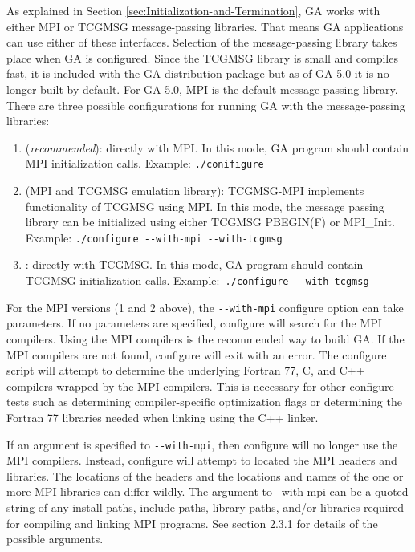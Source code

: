 As explained in Section \ref{sec:Initialization-and-Termination},
GA works with either MPI or TCGMSG message-passing libraries. That
means GA applications can use either of these interfaces. Selection
of the message-passing library takes place when GA is configured.
Since the TCGMSG library is small and compiles fast, it is included
with the GA distribution package but as of GA 5.0 it is no longer
built by default. For GA 5.0, MPI is the default message-passing library.
There are three possible configurations for running GA with the message-passing
libraries:
\begin{enumerate}
\item \textcolor{black}{} (\emph{recommended}): directly
with MPI. In this mode, GA program should contain MPI initialization
calls. Example: \texttt{./conifigure}
\item \textcolor{black}{} (MPI and TCGMSG emulation
library): TCGMSG-MPI implements functionality of TCGMSG using MPI.
In this mode, the message passing library can be initialized using
either TCGMSG PBEGIN(F) or MPI\_Init. Example: \texttt{./configure
-{}-with-mpi -{}-with-tcgmsg }
\item \textcolor{black}{}: directly with TCGMSG.
In this mode, GA program should contain TCGMSG initialization calls.
Example:\texttt{ ./configure -{}-with-tcgmsg }
\end{enumerate}
For the MPI versions (1 and 2 above), the \texttt{-{}-with-mpi} configure
option can take parameters. If no parameters are specified, configure
will search for the MPI compilers. Using the MPI compilers is the
recommended way to build GA. If the MPI compilers are not found, configure
will exit with an error. The configure script will attempt to determine
the underlying Fortran 77, C, and C++ compilers wrapped by the MPI
compilers. This is necessary for other configure tests such as determining
compiler-specific optimization flags or determining the Fortran 77
libraries needed when linking using the C++ linker.

If an argument is specified to \texttt{-{}-with-mpi}, then configure
will no longer use the MPI compilers. Instead, configure will attempt
to located the MPI headers and libraries. The locations of the headers
and the locations and names of the one or more MPI libraries can differ
wildly. The argument to --with-mpi can be a quoted string of any install
paths, include paths, library paths, and/or libraries required for
compiling and linking MPI programs. See section 2.3.1 for details
of the possible arguments. 


